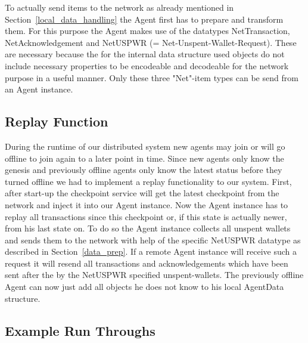 To actually  send items to the network as already mentioned in Section~\ref{local_data_handling}  the Agent first has to prepare and transform them.
For this purpose the Agent makes use of the datatypes NetTransaction, NetAcknowledgement and NetUSPWR (= Net-Unspent-Wallet-Request).
These are necessary because the for the internal data structure used objects do not include necessary properties to be encodeable and decodeable for the network purpose in a useful manner.
Only these three "Net"-item types can be send from an Agent instance.


\subsection{Replay Function}
During the runtime of our distributed system new agents may join or will go offline to join again to a later point in time.
Since new agents only know the genesis and previously offline agents only know the latest status before they turned offline we had to implement a replay functionality to our system.
First, after start-up the checkpoint service will get the latest checkpoint from the network and inject it into our Agent instance.
Now the Agent instance has to replay all transactions since this checkpoint or, if this state is actually newer, from his last state on.
To do so the Agent instance collects all unspent wallets and sends them to the network with help of the specific NetUSPWR datatype as described in Section~\ref{data_prep}.
If a remote Agent instance will receive such a request it will resend all transactions and acknowledgements which have been sent after the by the NetUSPWR specified unspent-wallets.
The previously offline Agent can now just add all objects he does not know to his local AgentData structure.


\subsection{Example Run Throughs}

